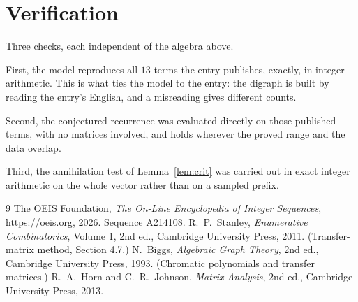\documentclass[11pt,a4paper]{article}
\theoremstyle{plain}
\theoremstyle{definition}
\begin{document}
\section{Verification}

Three checks, each independent of the algebra above.

First, the model reproduces all $13$ terms the entry publishes, exactly, in integer
arithmetic. This is what ties the model to the entry: the digraph is built by reading the
entry's English, and a misreading gives different counts.

Second, the conjectured recurrence was evaluated directly on those published terms, with no
matrices involved, and holds wherever the proved range and the data overlap.

Third, the annihilation test of Lemma~\ref{lem:crit} was carried out in exact integer
arithmetic on the whole vector rather than on a sampled prefix.

\begin{thebibliography}{9}
 The OEIS Foundation, \emph{The On-Line Encyclopedia of Integer
Sequences}, \url{https://oeis.org}, 2026. Sequence A214108.
 R.~P.~Stanley, \emph{Enumerative Combinatorics}, Volume 1, 2nd ed.,
Cambridge University Press, 2011. (Transfer-matrix method, Section 4.7.)
 N.~Biggs, \emph{Algebraic Graph Theory}, 2nd ed., Cambridge University
Press, 1993. (Chromatic polynomials and transfer matrices.)
 R.~A.~Horn and C.~R.~Johnson, \emph{Matrix Analysis}, 2nd ed., Cambridge
University Press, 2013.
\end{thebibliography}
\end{document}
